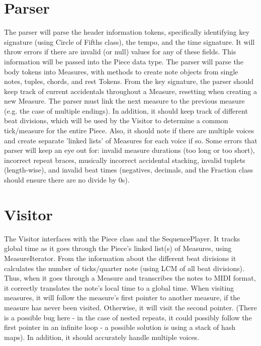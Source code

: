 \documentclass{amsart}
\begin{document}
\section{ Parser }
The parser will parse the header information tokens, specifically identifying key signature (using Circle of Fifths class), the tempo, and the time signature.  It will throw errors if there are invalid (or null) values for any of these fields.  This information will be passed into the Piece data type.  
The parser will parse the body tokens into Measures, with methods to create note objects from single notes, tuples, chords, and rest Tokens.  From the key signature, the parser should keep track of current accidentals throughout a Measure, resetting when creating a new Measure.  The parser must link the next measure to the previous measure (e.g. the case of multiple endings).  In addition, it should keep track of different beat divisions, which will be used by the Visitor to determine a common tick/measure for the entire Piece.  Also, it should note if there are multiple voices and create separate 'linked lists' of Measures for each voice if so.  
Some errors that parser will keep an eye out for: invalid measure durations (too long or too short), incorrect repeat braces, musically incorrect accidental stacking, invalid tuplets (length-wise), and invalid beat times (negatives, decimals, and the Fraction class should ensure there are no divide by 0s). 

\section{ Visitor }
The Visitor interfaces with the Piece class and the SequencePlayer.  It tracks global time as it goes through the Piece's linked list(s) of Measures, using MeasureIterator.  From the information about the different beat divisions it calculates the number of ticks/quarter note (using LCM of all beat divisions).  Thus, when it goes through a Measure and transcribes the notes to MIDI format, it correctly translates the note's local time to a global time.  When visiting measures, it will follow the measure's first pointer to another measure, if the measure has never been visited.  Otherwise, it will visit the second pointer.  (There is a possible bug here - in the case of nested repeats, it could possibly follow the first pointer in an infinite loop - a possible solution is using a stack of hash maps).  In addition, it should accurately handle multiple voices.  
\end{document}
